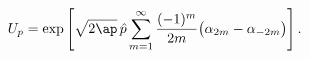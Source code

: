 \begin{equation}
U_p=\exp\left[\sqrt{2\ap}\,\hat{p}
\sum_{m=1}^{\infty}\frac{(-1)^m}{2m}\bigl(
\alpha_{2m}-\alpha_{-2m}\bigr)\right].
\label{Ud}
\end{equation}

